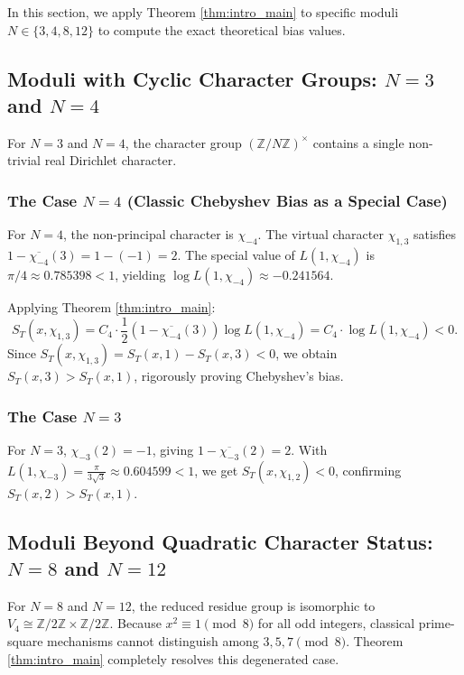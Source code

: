 \documentclass[12pt,reqno]{amsart}
\theoremstyle{definition}
\theoremstyle{remark}
\numberwithin{equation}{section}
\begin{document}
In this section, we apply Theorem \ref{thm:intro_main} to specific moduli $N \in \{3, 4, 8, 12\}$ to compute the exact theoretical bias values.

\subsection{Moduli with Cyclic Character Groups: $N = 3$ and $N = 4$}

For $N=3$ and $N=4$, the character group $(\mathbb{Z}/N\mathbb{Z})^\times$ contains a single non-trivial real Dirichlet character.

\subsubsection{The Case $N = 4$ (Classic Chebyshev Bias as a Special Case)}
For $N=4$, the non-principal character is $\chi_{-4}$. The virtual character $\chi_{1,3}$ satisfies $1 - \overline{\chi_{-4}}(3) = 1 - (-1) = 2$.
The special value of $L(1, \chi_{-4})$ is $\pi/4 \approx 0.785398 < 1$, yielding $\log L(1, \chi_{-4}) \approx -0.241564$.

Applying Theorem \ref{thm:intro_main}:
\begin{equation}
S_T(x, \chi_{1,3}) = C_4 \cdot \frac{1}{2} (1 - \overline{\chi_{-4}}(3)) \log L(1, \chi_{-4}) = C_4 \cdot \log L(1, \chi_{-4}) < 0.
\end{equation}
Since $S_T(x, \chi_{1,3}) = S_T(x, 1) - S_T(x, 3) < 0$, we obtain $S_T(x, 3) > S_T(x, 1)$, rigorously proving Chebyshev's bias.

\subsubsection{The Case $N = 3$}
For $N=3$, $\chi_{-3}(2) = -1$, giving $1 - \overline{\chi_{-3}}(2) = 2$. With $L(1, \chi_{-3}) = \frac{\pi}{3\sqrt{3}} \approx 0.604599 < 1$, we get $S_T(x, \chi_{1,2}) < 0$, confirming $S_T(x, 2) > S_T(x, 1)$.

\subsection{Moduli Beyond Quadratic Character Status: $N = 8$ and $N = 12$}

For $N=8$ and $N=12$, the reduced residue group is isomorphic to $V_4 \cong \mathbb{Z}/2\mathbb{Z} \times \mathbb{Z}/2\mathbb{Z}$. Because $x^2 \equiv 1 \pmod 8$ for all odd integers, classical prime-square mechanisms cannot distinguish among $3, 5, 7 \pmod 8$. Theorem \ref{thm:intro_main} completely resolves this degenerated case.
\end{document}
